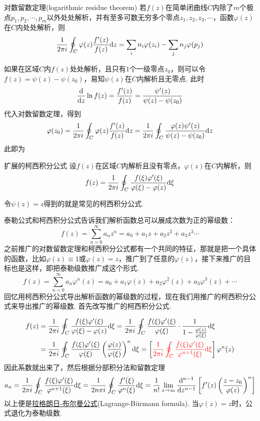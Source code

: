 \begin{theorem}{对数留数定理(logarithmic residue theorem)}
    若\(f(z)\)在简单闭曲线\(C\)内除了\(m\)个极点\(p_1, p_2, \cdots, p_m\)以外处处解析，并有至多可数无穷多个零点\(z_1, z_2, z_3, \cdots\)，函数\(\varphi(z)\)在\(C\)内处处解析，则
    \[\frac{1}{2\pi i}\oint_{C}\varphi(z)\frac{f'(z)}{f(z)}{\rm d}z = \sum_{i}n_i\varphi(z_i) - \sum_{j}n_j\varphi(p_j)\]
\end{theorem}

如果在区域\(C\)内\(f(z)\)处处解析，且只有\(1\)个一级零点\(z_0\)，则可以令\(f(z)=\psi(z)-\psi(z_0)\)，易知\(\psi(z)\)在\(C\)内解析且无零点. 此时
\[\frac{{\rm d}}{{\rm d}z}\ln f(z) = \frac{f'(z)}{f(z)}=\frac{\psi'(z)}{\psi(z)-\psi(z_0)}\]
代入对数留数定理，得到
\[\varphi(z_0) = \frac{1}{2\pi i}\oint_C \varphi(z)\frac{f'(z)}{f(z)}{\rm d}z = \frac{1}{2\pi i}\oint_C\frac{\varphi(z)\psi'(z)}{\psi(z)-\psi(z_0)}{\rm d}z\]
此即为

\begin{theorem}{扩展的柯西积分公式}
    设\(f(z)\)在区域\(C\)内解析且没有零点，\(\varphi(z)\)在\(C\)内解析，则
    \[f(z)=\frac{1}{2 \pi i}\oint_C\frac{f(\xi)\varphi'(\xi)}{\varphi(\xi)-\varphi(z)}{\rm d}\xi\]
\end{theorem}
令\(\psi(z)=z\)得到的就是常见的柯西积分公式.

泰勒公式和柯西积分公式告诉我们解析函数总可以展成次数为正的幂级数：
\[f(z) = \sum_{n=0}^{\infty} a_nz^n = a_0 + a_1z + a_2z^2 + a_3z^3\cdots\]
之前推广的对数留数定理和柯西积分公式都有一个共同的特征，那就是把一个具体的函数，比如\(\varphi(z) \equiv 1\)或\(\varphi(z) = z\)，推广到了任意的\(\varphi(z)\)，接下来推广的目标也是这样，即把泰勒级数推广成这个形式.
\[f(z) = \sum_{n=0}^{\infty} a_n\varphi^n(z) = a_0 + a_1\varphi(z) + a_2\varphi^2(z) + a_3\varphi^3(z) + \cdots\]
回忆用柯西积分公式导出解析函数的幂级数的过程，现在我们用推广的柯西积分公式来导出推广的幂级数. 首先改写推广的柯西积分公式.

\begin{align*}
    f(z) &= \frac{1}{2 \pi i}\oint_C\frac{f(\xi)\varphi'(\xi)}{\varphi(\xi)-\varphi(z)}{\rm d}\xi
    = \frac{1}{2\pi i}\oint_C\frac{f(\xi)\varphi'(\xi)}{\varphi(\xi)}\cdot\frac{1}{1-\frac{\varphi(z)}{\varphi(\xi)}}{\rm d}\xi \\
    &= \frac{1}{2\pi i}\oint_C\frac{f(\xi)\varphi'(\xi)}{\varphi(\xi)}\left(\frac{\varphi(z)}{\varphi(\xi)}\right)^n{\rm d}\xi 
    = \left[{\color{red} \frac{1}{2\pi i}\oint_C\frac{f(\xi)\varphi'(\xi)}{\varphi^{n+1}(\xi)}{\rm d}\xi}\right]\varphi^n(z)
\end{align*}
因此系数就出来了，然后根据分部积分法和留数定理
\[a_n = \frac{1}{2\pi i}\oint_C\frac{f(\xi)\varphi'(\xi)}{\varphi^{n+1}(\xi)}{\rm d}\xi = \frac{1}{2n\pi i}\oint_C\frac{f'(\xi)}{\varphi^{n}(\xi)}{\rm d}\xi = \frac{1}{n!}\lim_{z \to z_0}\frac{{\rm d}^{n-1}}{{\rm d}z^{n-1}}\left[f'(z)\left(\frac{z-z_0}{\varphi(z)}\right)^n\right]\]
以上便是\uline{拉格朗日-布尔曼公式}(Lagrange-Bürmann formula). 当\(\varphi(z)=z\)时，公式退化为泰勒级数.


